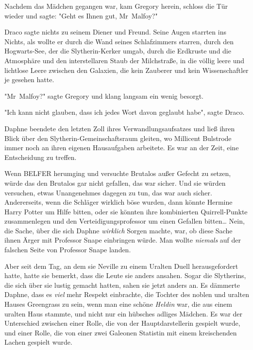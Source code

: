 {Nachdem das Mädchen gegangen war, kam Gregory herein, schloss die Tür wieder und sagte: "Geht es Ihnen gut, Mr~Malfoy?"

Draco sagte nichts zu seinem Diener und Freund. Seine Augen starrten ins Nichts, als wollte er durch die Wand seines Schlafzimmers starren, durch den Hogwarts-See, der die Slytherin-Kerker umgab, durch die Erdkruste und die Atmosphäre und den interstellaren Staub der Milchstraße, in die völlig leere und lichtlose Leere zwischen den Galaxien, die kein Zauberer und kein Wissenschaftler je gesehen hatte.

"Mr~Malfoy?" sagte Gregory und klang langsam ein wenig besorgt.

"Ich kann nicht glauben, dass ich jedes Wort davon geglaubt habe", sagte Draco.

Daphne beendete den letzten Zoll ihres Verwandlungsaufsatzes und ließ ihren Blick über den Slytherin-Gemeinschaftsraum gleiten, wo Millicent Bulstrode immer noch an ihren eigenen Hausaufgaben arbeitete. Es war an der Zeit, eine Entscheidung zu treffen.

Wenn BELFER herumging und versuchte Brutalos außer Gefecht zu setzen, würde das den Brutalos gar nicht gefallen, das war sicher. Und sie würden versuchen, etwas Unangenehmes dagegen zu tun, das war auch sicher. Andererseits, wenn die Schläger wirklich böse wurden, dann könnte Hermine Harry Potter um Hilfe bitten, oder sie könnten ihre kombinierten Quirrell-Punkte zusammenlegen und den Verteidigungsprofessor um einen Gefallen bitten… Nein, die Sache, über die sich Daphne \emph{wirklich} Sorgen machte, war, ob diese Sache ihnen Ärger mit Professor Snape einbringen würde. Man wollte \emph{niemals} auf der falschen Seite von Professor Snape landen.

Aber seit dem Tag, an dem sie Neville zu einem Uralten Duell herausgefordert hatte, hatte sie bemerkt, dass die Leute sie anders ansahen. Sogar die Slytherins, die sich über sie lustig gemacht hatten, sahen sie jetzt anders an. Es dämmerte Daphne, dass es \emph{viel} mehr Respekt einbrachte, die Tochter des noblen und uralten Hauses Greengrass zu sein, wenn man eine schöne \emph{Heldin} war, die aus einem uralten Haus stammte, und nicht nur ein hübsches adliges Mädchen. Es war der Unterschied zwischen einer Rolle, die von der Hauptdarstellerin gespielt wurde, und einer Rolle, die von einer zwei Galeonen Statistin mit einem kreischenden Lachen gespielt wurde.

}

